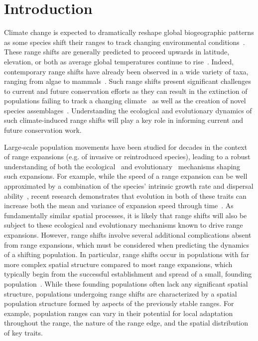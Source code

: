 \documentclass[12pt, oneside]{article}
\begin{document}
\newpage

\section*{Introduction}
Climate change is expected to dramatically reshape global biogeographic patterns as some species shift their ranges to track changing environmental conditions~\citep{gonzalez2010global}. These range shifts are generally predicted to proceed upwards in latitude, elevation, or both as average global temperatures continue to rise~\citep{loarie2009velocity}. Indeed, contemporary range shifts have already been observed in a wide variety of taxa, ranging from algae to mammals~\citep{chen2011rapid, parmesan2006ecological}. Such range shifts present significant challenges to current and future conservation efforts as they can result in the extinction of populations failing to track a changing climate~\citep{parmesan2006ecological} as well as the creation of novel species assemblages~\citep{hobbs2009novel}. Understanding the ecological and evolutionary dynamics of such climate-induced range shifts will play a key role in informing current and future conservation work.

Large-scale population movements have been studied for decades in the context of range expansions (e.g. of invasive or reintroduced species), leading to a robust understanding of both the ecological~\citep{hastings2005spatial} and evolutionary~\citep{shine2011evolutionary, excoffier2009genetic} mechanisms shaping such expansions. For example, while the speed of a range expansion can be well approximated by a combination of the species' intrinsic growth rate and dispersal ability~\citep{hastings2005spatial}, recent research demonstrates that evolution in both of these traits can increase both the mean and variance of expansion speed through time~\citep{weiss2017rapid, ochocki2017rapid, szHucs2017rapid, shaw2015dispersal, phillips2015evolutionary}. As fundamentally similar spatial processes, it is likely that range shifts will also be subject to these ecological and evolutionary mechanisms known to drive range expansions. However, range shifts involve several additional complications absent from range expansions, which must be considered when predicting the dynamics of a shifting population. In particular, range shifts occur in populations with far more complex spatial structure compared to most range expansions, which typically begin from the successful establishment and spread of a small, founding population~\citep{hastings2005spatial}. While these founding populations often lack any significant spatial structure, populations undergoing range shifts are characterized by a spatial population structure formed by aspects of the previously stable ranges. For example, population ranges can vary in their potential for local adaptation throughout the range, the nature of the range edge, and the spatial distribution of key traits. 
\end{document}
